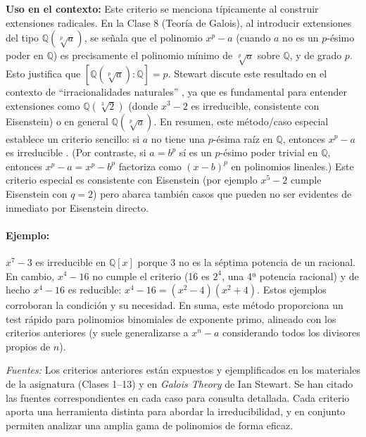 \documentclass[12pt, letter]{article}
\begin{document}
\textbf{Uso en el contexto:}  
Este criterio se menciona típicamente al construir extensiones radicales. En la Clase 8 (Teoría de Galois), al introducir extensiones del tipo $\mathbb{Q}(\sqrt[p]{a})$, se señala que el polinomio $x^p - a$ (cuando $a$ no es un $p$-ésimo poder en $\mathbb{Q}$) es precisamente el polinomio mínimo de $\sqrt[p]{a}$ sobre $\mathbb{Q}$, y de grado $p$. Esto justifica que $[\mathbb{Q}(\sqrt[p]{a}):\mathbb{Q}] = p$. Stewart discute este resultado en el contexto de “irracionalidades naturales” , ya que es fundamental para entender extensiones como $\mathbb{Q}(\sqrt[3]{2})$ (donde $x^3-2$ es irreducible, consistente con Eisenstein) o en general $\mathbb{Q}(\sqrt[p]{a})$. En resumen, este método/caso especial establece un criterio sencillo: si $a$ no tiene una $p$-ésima raíz en $\mathbb{Q}$, entonces $x^p - a$ es irreducible . (Por contraste, si $a = b^p$ sí es un $p$-ésimo poder trivial en $\mathbb{Q}$, entonces $x^p - a = x^p - b^p$ factoriza como $(x-b)^p$ en polinomios lineales.) Este criterio especial es consistente con Eisenstein (por ejemplo $x^5-2$ cumple Eisenstein con $q=2$) pero abarca también casos que pueden no ser evidentes de inmediato por Eisenstein directo.

\paragraph*{Ejemplo:}
$x^7 - 3$ es irreducible en $\mathbb{Q}[x]$ porque $3$ no es la séptima potencia de un racional. En cambio, $x^4 - 16$ no cumple el criterio (16 es $2^4$, una 4ª potencia racional) y de hecho $x^4-16$ es reducible: $x^4-16=(x^2-4)(x^2+4)$. Estos ejemplos corroboran la condición y su necesidad. En suma, este método proporciona un test rápido para polinomios binomiales de exponente primo, alineado con los criterios anteriores (y suele generalizarse a $x^n - a$ considerando todos los divisores propios de $n$).

\medskip
\noindent
\textit{Fuentes:} Los criterios anteriores están expuestos y ejemplificados en los materiales de la asignatura (Clases 1–13) y en \emph{Galois Theory} de Ian Stewart. Se han citado las fuentes correspondientes en cada caso para consulta detallada. Cada criterio aporta una herramienta distinta para abordar la irreducibilidad, y en conjunto permiten analizar una amplia gama de polinomios de forma eficaz.
\end{document}
